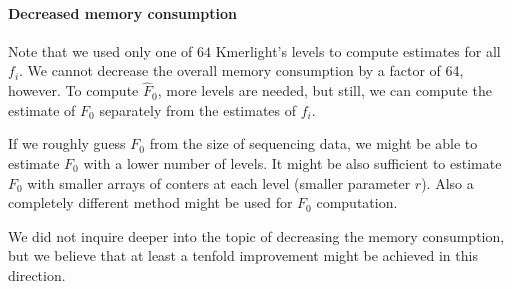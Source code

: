 \paragraph{Decreased memory consumption}
Note that we used only one of $64$ Kmerlight's levels to compute estimates for all $f_i$.
We cannot decrease the overall memory consumption by a factor of 64, however. 
To compute $\hat F_0$, more levels are needed, but still, we can compute the estimate
of $F_0$ separately from the estimates of $f_i$.

If we roughly guess $F_0$ from the size of sequencing data, we might be able
to estimate $F_0$ with a lower number of levels. It might be also sufficient
to estimate $F_0$ with smaller arrays of conters at each level (smaller parameter $r$).
Also a completely different method might be used for $F_0$ computation.

We did not inquire deeper into the topic of decreasing the memory consumption,
but we believe that at least a tenfold improvement might be achieved in this direction.